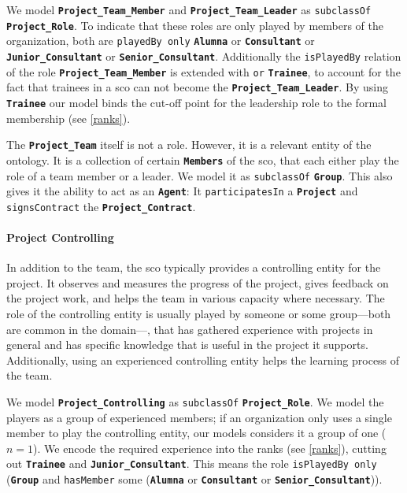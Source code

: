 \documentclass[a4paper, DIV=13, BCOR=0cm]{scrbook}
\newcommand{\class}[1]{\texttt{\textbf{#1}}}
\newcommand{\relation}[1]{\texttt{#1}}
\begin{document}
We model \class{Project\_Team\_Member} and \class{Project\_Team\_Leader} as \relation{subclassOf} \class{Project\_Role}. To indicate that these roles are only played by members of the organization, both are \relation{playedBy only}
\class{Alumna} or \class{Consultant} or \class{Junior\_Consultant} or \class{Senior\_Consultant}. Additionally the \relation{isPlayedBy} relation of the role \class{Project\_Team\_Member} is extended with \relation{or} \class{Trainee}, to account for the fact that trainees in a \gls{sco} can not become the \class{Project\_Team\_Leader}. By using \class{Trainee} our model binds the cut-off point for the leadership role to the formal membership (see \ref{ranks}).

The \class{Project\_Team} itself is not a role. However, it is a relevant entity of the ontology. It is a collection of certain \class{Members} of the \gls{sco}, that each either play the role of a team member or a leader. We model it as \relation{subclassOf} \class{Group}. This also gives it the ability to act as an \class{Agent}: It \relation{participatesIn} a \class{Project} and \relation{signsContract} the \class{Project\_Contract}.

\paragraph{Project Controlling}
In addition to the team, the \gls{sco} typically provides a controlling entity for the project. It observes and measures the progress of the project, gives feedback on the project work, and helps the team in various capacity where necessary. The role of the controlling entity is usually played by someone or some group---both are common in the domain---, that has gathered experience with projects in general and has specific knowledge that is useful in the project it supports. Additionally, using an experienced controlling entity helps the learning process of the team.

We model \class{Project\_Controlling} as \relation{subclassOf} \class{Project\_Role}. We model the players as a group of experienced members; if an organization only uses a single member to play the controlling entity, our models considers it a group of one ($n = 1$). We encode the required experience into the ranks (see \ref{ranks}), cutting out \class{Trainee} and \class{Junior\_Consultant}. This means the role \relation{isPlayedBy only} (\class{Group} and \relation{hasMember} some (\class{Alumna} or \class{Consultant} or \class{Senior\_Consultant})).
\end{document}
